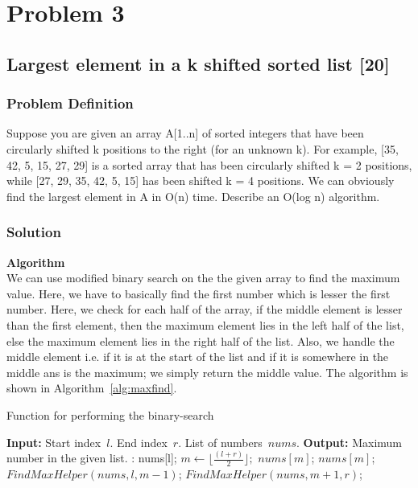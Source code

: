 \documentclass{article}
\begin{document}
\section*{Problem 3}
\subsection*{Largest element in a k shifted sorted list [20]} 
\subsubsection*{Problem Definition}
Suppose you are given an array A[1..n] of sorted integers that have been circularly shifted k positions to the right (for an unknown k). For example, [35, 42, 5, 15, 27, 29] is a sorted array that has been circularly shifted k = 2 positions, while [27, 29, 35, 42, 5, 15] has been shifted k = 4 positions. We can obviously find the largest element in A in O(n) time. Describe an O(log n) algorithm.
\subsubsection*{Solution}
\textbf{Algorithm}\\
We can use modified binary search on the the given array to find the maximum value. Here, we have to basically find the first number which is lesser the first number. Here, we check for each half of the array, if the middle element is lesser than the first element, then the maximum element lies in the left half of the list, else the maximum element lies in the right half of the list. Also, we handle the middle element i.e. if it is at the start of the list and if it is somewhere in the middle ans is the maximum; we simply return the middle value. The algorithm is shown in Algorithm~\ref{alg:maxfind}.\\

\begin{algorithm}
\caption{Function for performing the binary-search}
\label{alg:bsearch}
\begin{algorithmic}[1]
\State \textbf{Input:} Start index\ $l$. End index\ $r$. List of numbers\ $nums$.
\State \textbf{Output:} Maximum number in the given list.
:
\State \Return nums[l];
\EndIf
\State $m \leftarrow \lfloor \frac{(l+r)}{2}\rfloor;$
\State \Return $nums[m]$;
\State \Return $nums[m]$;
\EndIf
{}
\State \Return $FindMaxHelper(nums, l, m-1)$;
\Else
\State \Return $FindMaxHelper(nums, m+1, r)$;
\EndIf
\EndFunction
\end{algorithmic}
\end{algorithm}
\end{document}

